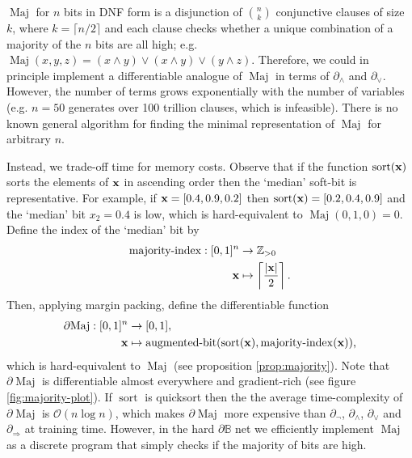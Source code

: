 \documentclass{article} %
\begin{document}
$\operatorname{Maj}$ for $n$ bits in DNF form is a disjunction of $\binom{n}{k}$ conjunctive clauses of size $k$, where $k=\lceil n/2 \rceil$ and each clause checks whether a unique combination of a majority of the $n$ bits are all high; e.g. $\operatorname{Maj}(x, y, z) = (x \wedge y) \vee (x \wedge y) \vee (y \wedge z)$. Therefore, we could in principle implement a differentiable analogue of $\operatorname{Maj}$ in terms of $\partial_{\wedge}$ and $\partial_{\vee}$. However, the number of terms grows exponentially with the number of variables (e.g. $n=50$ generates over 100 trillion clauses, which is infeasible). There is no known general algorithm for finding the minimal representation of $\operatorname{Maj}$ for arbitrary $n$.

Instead, we trade-off time for memory costs. Observe that if the function $\operatorname{sort}({\bf x})$ sorts the elements of ${\bf x}$ in ascending order then the `median' soft-bit is representative. For example, if ${\bf x} = [0.4, 0.9, 0.2]$ then $\operatorname{sort}({\bf x}) = [0.2, 0.4, 0.9]$ and the `median' bit $x_{2}=0.4$ is low, which is hard-equivalent to $\operatorname{Maj}(0, 1, 0) = 0$. Define the index of the `median' bit by
\begin{equation*}
\begin{aligned}
\operatorname{majority-index}: [0, 1]^{n} & \to \mathbb{Z}_{> 0}\\
{\bf x} & \mapsto \left\lceil \frac{|{\bf x}|}{2} \right\rceil
\text{.}
\end{aligned}
\end{equation*}
Then, applying margin packing, define the differentiable function
\begin{equation*}
\begin{aligned}
	\partial\!\operatorname{Maj}: [0,1]^{n} &\to [0,1], \\
	{\bf x} &\mapsto \operatorname{augmented-bit}(\operatorname{sort}({\bf x}), \operatorname{majority-index}({\bf x}))\text{,}
\end{aligned}
\end{equation*}
which is hard-equivalent to $\operatorname{Maj}$ (see proposition \ref{prop:majority}). Note that $\partial\!\operatorname{Maj}$ is differentiable almost everywhere and gradient-rich (see figure \ref{fig:majority-plot}). If $\operatorname{sort}$ is quicksort then the the average time-complexity of $\partial\!\operatorname{Maj}$ is $\mathcal{O}(n\log{}n)$, which makes $\partial\!\operatorname{Maj}$ more expensive than $\partial_{\neg}$, $\partial_{\wedge}$, $\partial_{\vee}$ and $\partial_{\Rightarrow}$ at training time. However, in the hard $\partial\mathbb{B}$ net we efficiently implement $\operatorname{Maj}$ as a discrete program that simply checks if the majority of bits are high.
\end{document}
